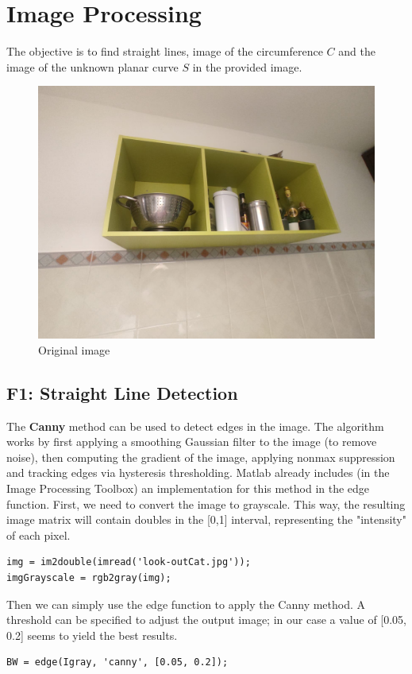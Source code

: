 \chapter{Image Processing}
The objective is to find straight lines, image of the circumference $C$ and the image of the unknown planar curve $S$ in the provided image.

\begin{figure}[H]
    \centering
    \includegraphics[width=0.75\linewidth]{img/Look-outCat.jpg}
    \caption{Original image}
    \label{fig:originalImage}
\end{figure}

\section{F1: Straight Line Detection}
The \textbf{Canny} method can be used to detect edges in the image. The algorithm works by first applying a smoothing Gaussian filter to the image (to remove noise), then computing the gradient of the image, applying nonmax suppression and tracking edges via hysteresis thresholding.
Matlab already includes (in the Image Processing Toolbox) an implementation for this method in the edge function.
First, we need to convert the image to grayscale. This way, the resulting image matrix will contain doubles in the [0,1] interval, representing the "intensity" of each pixel.

\begin{verbatim}
img = im2double(imread('look-outCat.jpg'));
imgGrayscale = rgb2gray(img);
\end{verbatim}

Then we can simply use the edge function to apply the Canny method. A threshold can be specified to adjust the output image; in our case a value of [0.05, 0.2] seems to yield the best results.
\begin{verbatim}
BW = edge(Igray, 'canny', [0.05, 0.2]);
\end{verbatim}

